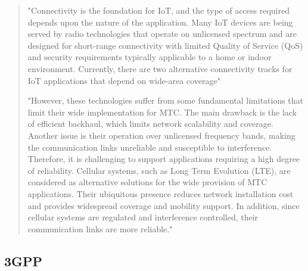 \documentclass[conference]{IEEEtran}
\begin{document}
\begin{quote}
"Connectivity is the foundation for IoT, and the type of access required depends upon the
nature of the application. Many IoT devices are being served by radio technologies that
operate on unlicensed spectrum and are designed for short-range connectivity with limited
Quality of Service (QoS) and security requirements typically applicable to a home or indoor
environment. Currently, there are two alternative connectivity tracks for IoT applications
that depend on wide-area coverage"

"However, these technologies suffer from some fundamental limitations that limit their wide implementation for
MTC. The main drawback is the lack of efficient backhaul, which limits network scalability and coverage. Another issue is their operation over unlicensed frequency bands, making the communication links unreliable and susceptible to interference. Therefore, it is challenging to support applications requiring a high degree of reliability. Cellular systems, such as Long Term Evolution (LTE), are considered as alternative solutions for the wide provision of MTC applications. Their ubiquitous presence reduces network installation cost and provides widespread coverage and mobility support. In addition, since cellular systems are regulated and interference
controlled, their communication links are more reliable."

\end{quote}

\subsection{3GPP}
\label{sec:1-1}
\end{document}
